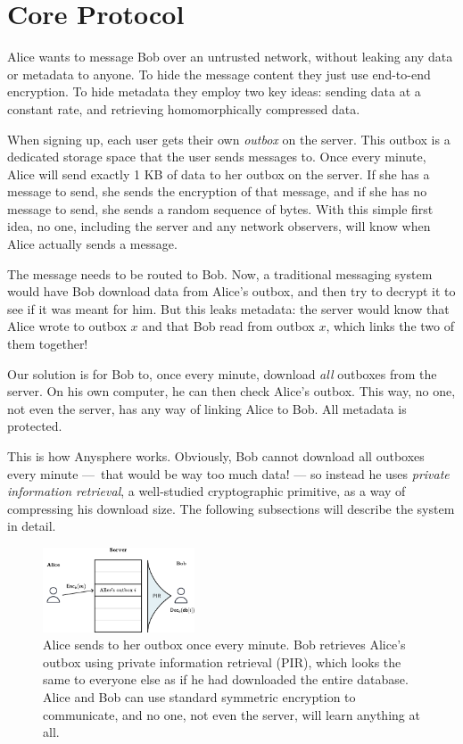 \section{Core Protocol}
\label{sec:coreprotocol}

Alice wants to message Bob over an untrusted network, without leaking any data or metadata to anyone. To hide the message content they just use end-to-end encryption. To hide metadata they employ two key ideas: sending data at a constant rate, and retrieving homomorphically compressed data.

When signing up, each user gets their own \textit{outbox} on the server. This outbox is a dedicated storage space that the user sends messages to. Once every minute, Alice will send exactly 1 KB of data to her outbox on the server. If she has a message to send, she sends the encryption of that message, and if she has no message to send, she sends a random sequence of bytes. With this simple first idea, no one, including the server and any network observers, will know when Alice actually sends a message.

The message needs to be routed to Bob. Now, a traditional messaging system would have Bob download data from Alice's outbox, and then try to decrypt it to see if it was meant for him. But this leaks metadata: the server would know that Alice wrote to outbox $x$ and that Bob read from outbox $x$, which links the two of them together!

Our solution is for Bob to, once every minute, download \textit{all} outboxes from the server. On his own computer, he can then check Alice's outbox. This way, no one, not even the server, has any way of linking Alice to Bob. All metadata is protected.

This is how Anysphere works. Obviously, Bob cannot download all outboxes every minute — that would be way too much data! — so instead he uses \textit{private information retrieval}, a well-studied cryptographic primitive, as a way of compressing his download size. The following subsections will describe the system in detail.

\begin{figure}
    \centering
    \includegraphics[width=0.4\textwidth]{pirfigure.pdf}
\caption{Alice sends to her outbox once every minute. Bob retrieves Alice's outbox using private information retrieval (PIR), which looks the same to everyone else as if he had downloaded the entire database. Alice and Bob can use standard symmetric encryption to communicate, and no one, not even the server, will learn anything at all.}
\end{figure}



